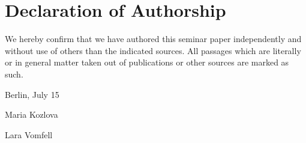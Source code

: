 
\section*{Declaration of Authorship}

We hereby confirm that we have authored this seminar paper independently and without use of others than the indicated
sources. All passages which are literally or in general matter
taken out of publications or other sources are marked as such.
\vspace{1cm}

Berlin, July 15 \vspace{0.5cm}

Maria Kozlova 

Lara Vomfell
